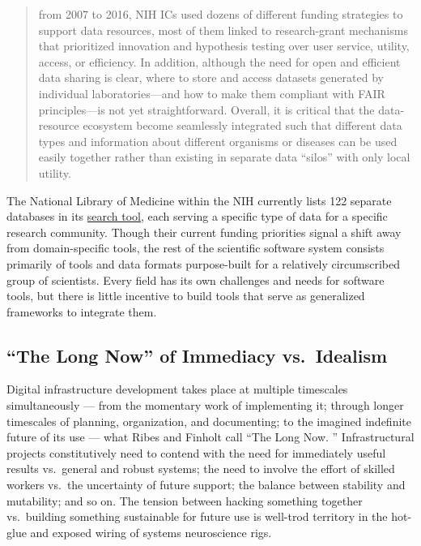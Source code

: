 \begin{quote}
from 2007 to 2016, NIH ICs used dozens of different funding strategies
to support data resources, most of them linked to research-grant
mechanisms that prioritized innovation and hypothesis testing over user
service, utility, access, or efficiency. In addition, although the need
for open and efficient data sharing is clear, where to store and access
datasets generated by individual laboratories---and how to make them
compliant with FAIR principles---is not yet straightforward. Overall, it
is critical that the data-resource ecosystem become seamlessly
integrated such that different data types and information about
different organisms or diseases can be used easily together rather than
existing in separate data ``silos'' with only local utility.
\end{quote}

The National Library of Medicine within the NIH currently lists 122
separate databases in its
\href{https://eresources.nlm.nih.gov/nlm_eresources/}{search tool}, each
serving a specific type of data for a specific research community.
Though their current funding priorities signal a shift away from
domain-specific tools, the rest of the scientific software system
consists primarily of tools and data formats purpose-built for a
relatively circumscribed group of scientists. Every field has its own
challenges and needs for software tools, but there is little incentive
to build tools that serve as generalized frameworks to integrate them.

\hypertarget{the-long-now-of-immediacy-vs.-idealism}{%
\subsection{``The Long Now'' of Immediacy
vs.~Idealism}\label{the-long-now-of-immediacy-vs.-idealism}}

Digital infrastructure development takes place at multiple timescales
simultaneously --- from the momentary work of implementing it; through
longer timescales of planning, organization, and documenting; to the
imagined indefinite future of its use --- what Ribes and Finholt call
``The Long Now. \citep{ribesLongNowTechnology2009} ''
Infrastructural projects constitutively need to contend with the need
for immediately useful results vs.~general and robust systems; the need
to involve the effort of skilled workers vs.~the uncertainty of future
support; the balance between stability and mutability; and so on. The
tension between hacking something together vs.~building something
sustainable for future use is well-trod territory in the hot-glue and
exposed wiring of systems neuroscience rigs.

